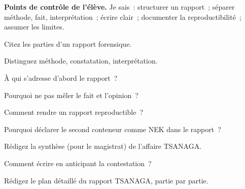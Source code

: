 \begin{boxinfo}
\textbf{Points de contrôle de l'élève.} Je sais~: structurer un rapport~;
séparer méthode, fait, interprétation~; écrire clair~; documenter la
reproductibilité~; assumer les limites.
\end{boxinfo}

\bigskip

\begin{boxexo}[title={\ding{45}\quad Exercice~18.1. Structure \niveaubase}]
Citez les parties d'un rapport forensique.
\end{boxexo}

\begin{boxexo}[title={\ding{45}\quad Exercice~18.2. Trois registres \niveaubase}]
Distinguez méthode, constatation, interprétation.
\end{boxexo}

\begin{boxexo}[title={\ding{45}\quad Exercice~18.3. Lecteur \niveaubase}]
À qui s'adresse d'abord le rapport~?
\end{boxexo}

\begin{boxexo}[title={\ding{45}\quad Exercice~18.4. Mêler \niveaumoyen}]
Pourquoi ne pas mêler le fait et l'opinion~?
\end{boxexo}

\begin{boxexo}[title={\ding{45}\quad Exercice~18.5. Reproductible \niveaumoyen}]
Comment rendre un rapport reproductible~?
\end{boxexo}

\begin{boxexo}[title={\ding{45}\quad Exercice~18.6. NEK \niveaumoyen}]
Pourquoi déclarer le second conteneur comme NEK dans le rapport~?
\end{boxexo}

\begin{boxexo}[title={\ding{45}\quad Exercice~18.7. Synthèse \niveaumoyen}]
Rédigez la synthèse (pour le magistrat) de l'affaire TSANAGA.
\end{boxexo}

\begin{boxexo}[title={\ding{45}\quad Exercice~18.8. Contradictoire \niveaumoyen}]
Comment écrire en anticipant la contestation~?
\end{boxexo}

\begin{boxexo}[title={\ding{45}\quad Exercice~18.9. Rapport complet \niveauexpert}]
Rédigez le plan détaillé du rapport TSANAGA, partie par partie.
\end{boxexo}

